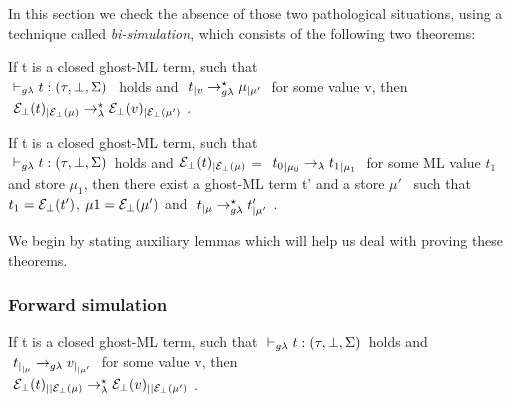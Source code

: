 

In this section we check the absence of those two pathological situations,
using a technique called \textit{bi-simulation}, which consists of 
the following two theorems:

\begin{theorem}
If t is a closed ghost-ML term, such that\\ 
$\typrule{t}{\tau}{\bot}{\Sigma}$ ~holds and $~t_{|v} \rightarrow_{g\lambda}^{\star} \mu_{|\mu'} ~$ 
for some value v, then\\ 
$~\mathcal{E}_{\bot}(t)_{|\mathcal{E}_{\bot}(\mu)} \rightarrow_{\lambda}^{\star} \mathcal{E}_{\bot}(v)_{|\mathcal{E}_{\bot}(\mu')} ~$.
\end{theorem}

\begin{theorem}
If t is a closed ghost-ML term, such that 
\\ $\typrule{t}{\tau}{\bot}{\Sigma}$~holds and 
$\mathcal{E}_{\bot}(t)_{|\mathcal{E}_{\bot}(\mu)}$ = $~{t_0}_{|{\mu_0}} \rightarrow_{\lambda} {t_{1}}_{|\mu_1} ~$ 
for some ML value $t_1$ and store $\mu_1$, 
then there exist a ghost-ML term t' and a store $\mu'$~
such that $t_1 =\mathcal{E}_{\bot}(t')$, $\mu1 = \mathcal{E}_{\bot}(\mu')$ and 
$~t_{|\mu} \rightarrow_{g\lambda}^{\star} t'_{|\mu'} ~$.
\end{theorem}

We begin by stating auxiliary lemmas which will help us deal with proving these theorems.
 
\subsubsection{Forward simulation}

\begin{lemma}
If t is a closed ghost-ML term, such that $\typrule{t}{\tau}{\bot}{\Sigma}$~holds 
and $~t_{|_{|\mu}} \rightarrow_{g\lambda} v_{|_{|\mu'}} ~$ for some value v, then\\ 
$~\mathcal{E}_{\bot}(t)_{||\mathcal{E}_{\bot}(\mu)} \rightarrow_{\lambda}^{\star} \mathcal{E}_{\bot}(v)_{||\mathcal{E}_{\bot}(\mu')} ~$.
\end{lemma}

%
%
%



